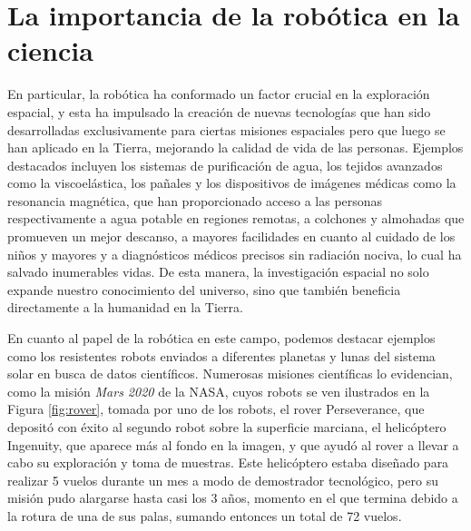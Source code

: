 \section{La importancia de la robótica en la ciencia}
\label{sec:exploracion_espacial} %

En particular, la robótica ha conformado un factor crucial en la exploración
espacial, y esta ha impulsado la creación de nuevas tecnologías que han sido
desarrolladas exclusivamente para ciertas misiones espaciales pero que luego se
han aplicado en la Tierra, mejorando la calidad de vida de las personas.
Ejemplos destacados incluyen los sistemas de purificación de agua, los tejidos
avanzados como la viscoelástica, los pañales y los dispositivos de imágenes
médicas como la resonancia magnética, que han proporcionado acceso a las
personas respectivamente a agua potable en regiones remotas, a colchones y
almohadas que promueven un mejor descanso, a mayores facilidades en cuanto al
cuidado de los niños y mayores y a diagnósticos médicos precisos sin radiación
nociva, lo cual ha salvado inumerables vidas.
De esta manera, la investigación espacial no solo expande nuestro conocimiento
del universo, sino que también beneficia directamente a la humanidad en la
Tierra.

En cuanto al papel de la robótica en este campo, podemos destacar ejemplos como
los resistentes robots enviados a diferentes planetas y lunas del sistema solar
en busca de datos científicos.
Numerosas misiones científicas lo evidencian, como la misión \textit{Mars 2020}
de la NASA, cuyos robots se ven ilustrados en la Figura \ref{fig:rover}, tomada
por uno de los robots, el rover Perseverance, que depositó con éxito al segundo
robot sobre la superficie marciana, el helicóptero Ingenuity, que aparece más al
fondo en la imagen, y que ayudó al rover a llevar a cabo su exploración y toma
de muestras.
Este helicóptero estaba diseñado para realizar 5 vuelos durante un mes a modo de
demostrador tecnológico, pero su misión pudo alargarse hasta casi los 3 años,
momento en el que termina debido a la rotura de una de sus palas, sumando
entonces un total de 72 vuelos.

